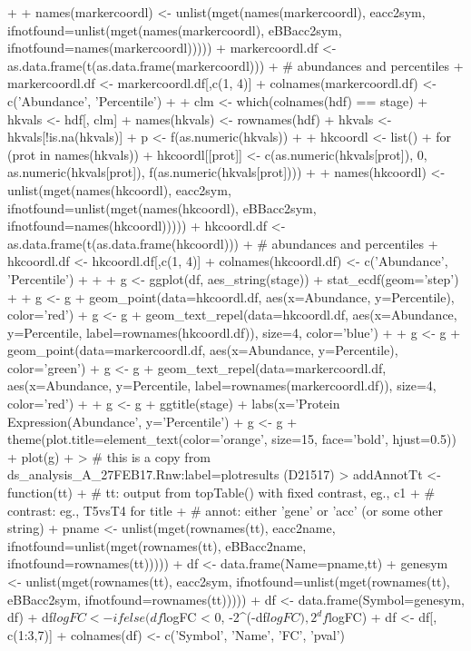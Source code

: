 \documentclass[a4paper]{article}
\begin{document}
\begin{Schunk}
\begin{Sinput}
{{+     }
+     names(markercoordl) <- unlist(mget(names(markercoordl), eacc2sym, ifnotfound=unlist(mget(names(markercoordl), eBBacc2sym, ifnotfound=names(markercoordl)))))
+     markercoordl.df <- as.data.frame(t(as.data.frame(markercoordl)))
+     # abundances and percentiles
+     markercoordl.df <- markercoordl.df[,c(1, 4)]
+     colnames(markercoordl.df) <- c('Abundance', 'Percentile')
+ 
+     clm <- which(colnames(hdf) == stage)
+     hkvals <- hdf[, clm]
+     names(hkvals) <- rownames(hdf)
+     hkvals <- hkvals[!is.na(hkvals)]
+     p <- f(as.numeric(hkvals))
+            
+     hkcoordl <- list()
+     for (prot in names(hkvals)) {
+         hkcoordl[[prot]] <- c(as.numeric(hkvals[prot]), 0, as.numeric(hkvals[prot]), f(as.numeric(hkvals[prot])))
+     }
+     names(hkcoordl) <- unlist(mget(names(hkcoordl), eacc2sym, ifnotfound=unlist(mget(names(hkcoordl), eBBacc2sym, ifnotfound=names(hkcoordl)))))
+     hkcoordl.df <- as.data.frame(t(as.data.frame(hkcoordl)))
+     # abundances and percentiles
+     hkcoordl.df <- hkcoordl.df[,c(1, 4)]
+     colnames(hkcoordl.df) <- c('Abundance', 'Percentile')
+     
+     
+     g <- ggplot(df, aes_string(stage)) + stat_ecdf(geom='step')
+     
+     g <- g + geom_point(data=hkcoordl.df, aes(x=Abundance, y=Percentile), color='red')
+     g <- g + geom_text_repel(data=hkcoordl.df, aes(x=Abundance, y=Percentile, label=rownames(hkcoordl.df)), size=4, color='blue')
+     
+     g <- g + geom_point(data=markercoordl.df, aes(x=Abundance, y=Percentile), color='green')
+     g <- g + geom_text_repel(data=markercoordl.df, aes(x=Abundance, y=Percentile, label=rownames(markercoordl.df)), size=4, color='red')
+         
+     g <- g + ggtitle(stage) + labs(x='Protein Expression(Abundance',  y='Percentile')
+     g <- g + theme(plot.title=element_text(color='orange', size=15, face='bold', hjust=0.5))
+     plot(g)
+ }
> # this is a copy from ds_analysis_A_27FEB17.Rnw:label=plotresults (D21517)
> addAnnotTt <- function(tt) {
+     # tt: output from topTable() with fixed contrast, eg., c1
+     # contrast: eg., T5vsT4 for title
+     # annot: either 'gene' or 'acc' (or some other string)
+     pname <- unlist(mget(rownames(tt), eacc2name, ifnotfound=unlist(mget(rownames(tt), eBBacc2name, ifnotfound=rownames(tt)))))
+     df <- data.frame(Name=pname,tt)
+     genesym <- unlist(mget(rownames(tt), eacc2sym, ifnotfound=unlist(mget(rownames(tt), eBBacc2sym, ifnotfound=rownames(tt)))))
+     df <- data.frame(Symbol=genesym, df)
+     df$logFC <- ifelse(df$logFC < 0, -2^(-df$logFC), 2^df$logFC)
+     df <- df[, c(1:3,7)]
+     colnames(df) <- c('Symbol', 'Name', 'FC', 'pval')
}
\end{Sinput}
\end{Schunk}
\end{document}
